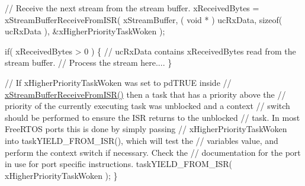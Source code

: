 \begin{DoxyPre}    // Receive the next stream from the stream buffer.
    xReceivedBytes = xStreamBufferReceiveFromISR( xStreamBuffer,
                                                  ( void * ) ucRxData,
                                                  sizeof( ucRxData ),
                                                  \&xHigherPriorityTaskWoken );\end{DoxyPre}



\begin{DoxyPre}    if( xReceivedBytes > 0 )
    \{
        // ucRxData contains xReceivedBytes read from the stream buffer.
        // Process the stream here....
    \}\end{DoxyPre}



\begin{DoxyPre}    // If xHigherPriorityTaskWoken was set to pdTRUE inside
    // \mbox{\hyperlink{stream__buffer_8h_a6c882a1d9f26c40f93f271bd1b844b3b}{xStreamBufferReceiveFromISR()}} then a task that has a priority above the
    // priority of the currently executing task was unblocked and a context
    // switch should be performed to ensure the ISR returns to the unblocked
    // task.  In most FreeRTOS ports this is done by simply passing
    // xHigherPriorityTaskWoken into taskYIELD\_FROM\_ISR(), which will test the
    // variables value, and perform the context switch if necessary.  Check the
    // documentation for the port in use for port specific instructions.
    taskYIELD\_FROM\_ISR( xHigherPriorityTaskWoken );
\}
\end{DoxyPre}
 